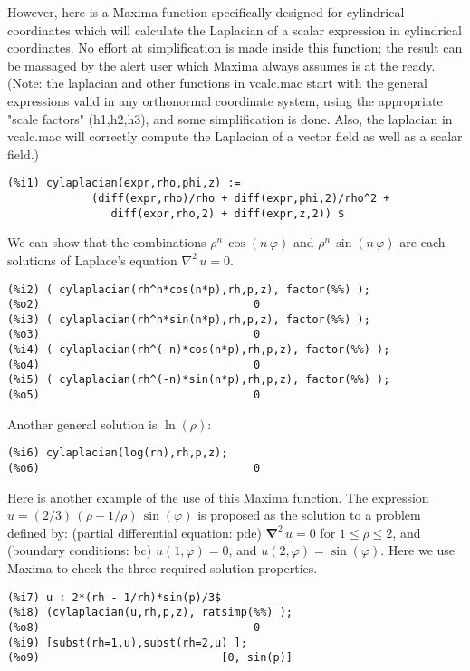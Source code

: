 \documentclass[12pt]{article}
\begin{document}
  \smallskip
  However, here is a Maxima function specifically designed for cylindrical coordinates
  which will calculate the Laplacian of a scalar expression in cylindrical coordinates.
No effort at simplification is made inside this function; the result
  can be massaged by the alert user which Maxima always assumes is at the ready.  
(Note: the laplacian and other functions in vcalc.mac start with the general 
  expressions valid in any orthonormal coordinate system, using the appropriate
  "scale factors" (h1,h2,h3), and some simplification is done.
Also, the laplacian in vcalc.mac will correctly compute the Laplacian of
  a vector field as well as a scalar field.)  
\small
\begin{verbatim}
(%i1) cylaplacian(expr,rho,phi,z) :=                
             (diff(expr,rho)/rho + diff(expr,phi,2)/rho^2 +
                diff(expr,rho,2) + diff(expr,z,2)) $   
\end{verbatim}
\normalsize

\newpage
We can show that the combinations $\rho^n\,\cos(n\,\varphi)$ and $\rho^n\,\sin(n\,\varphi)$
  are each solutions of Laplace's equation $\nabla^2\,u = 0$.
\small
\begin{verbatim}
(%i2) ( cylaplacian(rh^n*cos(n*p),rh,p,z), factor(%%) );
(%o2)                                 0
(%i3) ( cylaplacian(rh^n*sin(n*p),rh,p,z), factor(%%) );
(%o3)                                 0
(%i4) ( cylaplacian(rh^(-n)*cos(n*p),rh,p,z), factor(%%) );
(%o4)                                 0
(%i5) ( cylaplacian(rh^(-n)*sin(n*p),rh,p,z), factor(%%) );
(%o5)                                 0
\end{verbatim}
\normalsize
Another general solution is $\ln(\rho)$:
\small
\begin{verbatim}
(%i6) cylaplacian(log(rh),rh,p,z);
(%o6)                                 0
\end{verbatim}
\normalsize


Here is another example of the use of this Maxima function.
The expression $u = (2/3)\,(\rho - 1/\rho)\,\sin(\varphi)$ is proposed as the solution to
  a problem defined by: (partial differential equation: pde)
  \; $\boldsymbol{\nabla}^2\,u = 0$ for $1 \le \rho \le 2$,
  and (boundary conditions: bc) $u(1,\varphi) = 0$, and $u(2,\varphi) = \sin(\varphi)$.
Here we use Maxima to check the three required solution properties.  
\small
\begin{verbatim}
(%i7) u : 2*(rh - 1/rh)*sin(p)/3$
(%i8) (cylaplacian(u,rh,p,z), ratsimp(%%) );
(%o8)                                 0
(%i9) [subst(rh=1,u),subst(rh=2,u) ];
(%o9)                            [0, sin(p)]
\end{verbatim}
\normalsize
    
\end{document}
